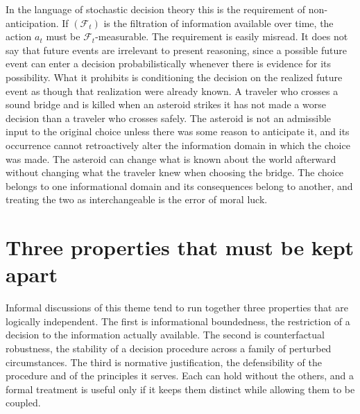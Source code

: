 \documentclass[11pt]{article}
\newcommand{\F}{\mathcal F}
\theoremstyle{definition}
\begin{document}
In the language of stochastic decision theory this is the requirement of non-anticipation. If $(\F_t)$ is the filtration of information available over time, the action $a_t$ must be $\F_t$-measurable. The requirement is easily misread. It does not say that future events are irrelevant to present reasoning, since a possible future event can enter a decision probabilistically whenever there is evidence for its possibility. What it prohibits is conditioning the decision on the realized future event as though that realization were already known. A traveler who crosses a sound bridge and is killed when an asteroid strikes it has not made a worse decision than a traveler who crosses safely. The asteroid is not an admissible input to the original choice unless there was some reason to anticipate it, and its occurrence cannot retroactively alter the information domain in which the choice was made. The asteroid can change what is known about the world afterward without changing what the traveler knew when choosing the bridge. The choice belongs to one informational domain and its consequences belong to another, and treating the two as interchangeable is the error of moral luck.

\section{Three properties that must be kept apart}

Informal discussions of this theme tend to run together three properties that are logically independent. The first is informational boundedness, the restriction of a decision to the information actually available. The second is counterfactual robustness, the stability of a decision procedure across a family of perturbed circumstances. The third is normative justification, the defensibility of the procedure and of the principles it serves. Each can hold without the others, and a formal treatment is useful only if it keeps them distinct while allowing them to be coupled.
\end{document}
